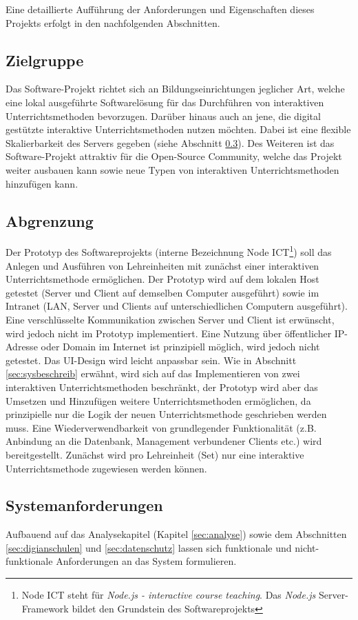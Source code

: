 Eine detaillierte Aufführung der Anforderungen und Eigenschaften dieses Projekts erfolgt in den nachfolgenden Abschnitten. 

\subsection{Zielgruppe}\label{sec:zielgruppe}
Das Software-Projekt richtet sich an Bildungseinrichtungen jeglicher Art, welche eine lokal ausgeführte Softwarelösung für das Durchführen von interaktiven Unterrichtsmethoden bevorzugen. Darüber hinaus auch an jene, die digital gestützte interaktive Unterrichtsmethoden nutzen möchten. Dabei ist eine flexible Skalierbarkeit des Servers gegeben (siehe Abschnitt \ref{sec:anforderung}). Des Weiteren ist das Software-Projekt attraktiv für die Open-Source Community, welche das Projekt weiter ausbauen kann sowie neue Typen von interaktiven Unterrichtsmethoden hinzufügen kann.
\subsection{Abgrenzung}\label{sec:abgrenz}
Der Prototyp des Softwareprojekts (interne Bezeichnung Node ICT\footnote{Node ICT steht für \emph{Node.js - interactive course teaching}. Das \emph{Node.js} Server-Framework bildet den Grundstein des Softwareprojekts}) soll das Anlegen und Ausführen von Lehreinheiten mit zunächst einer interaktiven Unterrichtsmethode ermöglichen. Der Prototyp wird auf dem lokalen Host getestet (Server und Client auf demselben Computer ausgeführt) sowie im Intranet (LAN, Server und Clients auf unterschiedlichen Computern ausgeführt). Eine verschlüsselte Kommunikation zwischen Server und Client ist erwünscht, wird jedoch nicht im Prototyp implementiert. Eine Nutzung über öffentlicher IP-Adresse oder Domain im Internet ist prinzipiell möglich, wird jedoch nicht getestet. Das UI-Design wird leicht anpassbar sein. Wie in Abschnitt \ref{sec:sysbeschreib} erwähnt, wird sich auf das Implementieren von zwei interaktiven Unterrichtsmethoden beschränkt, der Prototyp wird aber das Umsetzen und Hinzufügen weitere Unterrichtsmethoden ermöglichen, da prinzipielle nur die Logik der neuen Unterrichtsmethode geschrieben werden muss. Eine Wiederverwendbarkeit von grundlegender Funktionalität (z.B. Anbindung an die Datenbank, Management verbundener Clients etc.) wird bereitgestellt. Zunächst wird pro Lehreinheit (Set) nur eine interaktive Unterrichtsmethode zugewiesen werden können.  
\subsection{Systemanforderungen}\label{sec:anforderung}
Aufbauend auf das Analysekapitel (Kapitel \ref{sec:analyse}) sowie dem Abschnitten \ref{sec:digianschulen} und \ref{sec:datenschutz} lassen sich funktionale und nicht-funktionale Anforderungen an das System formulieren. 

